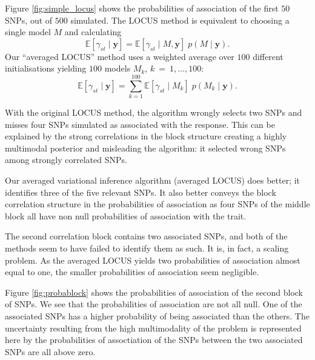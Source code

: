 \documentclass[a4paper, 11pt]{report}
\numberwithin{equation}{chapter}
\begin{document}
Figure \ref{fig:simple_locus} shows the probabilities of association of the first $50$ SNPs, out of $500$ simulated. The LOCUS method is equivalent to choosing a single model $M$ and calculating
\begin{equation*}
\mathbb{E}\left[\gamma_{st}\mid\boldsymbol{y}\right] = \mathbb{E}\left[\gamma_{st}\mid M,\boldsymbol{y}\right]\;p\left(M\mid\boldsymbol{y}\right).
\end{equation*}
Our ``averaged LOCUS'' method uses a weighted average over $100$ different initialisations yielding $100$ models $ M_k$, $k~=~1,\ldots,100$:
\begin{equation*}
\mathbb{E}\left[\gamma_{st}\mid\boldsymbol{y}\right] = \sum_{k=1}^{100}\mathbb{E}\left[\gamma_{st}\mid M_k\right]\;p\left(M_k\mid\boldsymbol{y}\right).
\end{equation*}

With the original LOCUS method, the algorithm wrongly selects two SNPs and misses four SNPs simulated as associated with the response. This can be explained by the strong correlations in the block structure creating a highly multimodal posterior and misleading the algorithm: it selected wrong SNPs among strongly correlated SNPs.

Our averaged variational inference algorithm (averaged LOCUS) does better; it identifies three of the five relevant SNPs. It also better conveys the block correlation structure in the probabilities of association as four SNPs of the middle block all have non null probabilities of association with the trait. 

The second correlation block contains two associated SNPs, and both of the methods seem to have failed to identify them as such. It is, in fact, a scaling problem. As the averaged LOCUS yields two probabilities of association almost equal to one, the smaller probabilities of association seem negligible.

Figure \ref{fig:probablock} shows the probabilities of association of the second block of SNPs. We see that the probabilities of association are not all null. One of the associated SNPs has a higher probability of being associated than the others. The uncertainty resulting from the high multimodality of the problem is represented here by the probabilities of assoctiation of the SNPs between the two associated SNPs are all above zero. 
\end{document}
